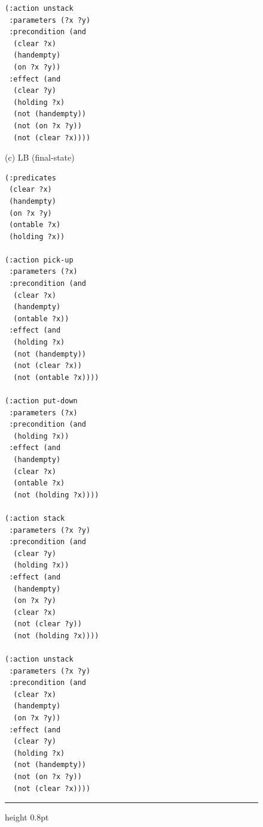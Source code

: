 \begin{figure}[t]
\begin{minipage}[t]{0.33\textwidth}
\begin{lstlisting}
(:action unstack
 :parameters (?x ?y)
 :precondition (and
  (clear ?x)
  (handempty)
  (on ?x ?y))
 :effect (and
  (clear ?y)
  (holding ?x)
  (not (handempty))
  (not (on ?x ?y))
  (not (clear ?x))))
\end{lstlisting}
\end{minipage}\hfill%
\begin{minipage}[t]{0.33\textwidth}
\vspace{0pt}
{\centering (c) LB (final-state)\par}
\begin{lstlisting}
(:predicates
 (clear ?x)
 (handempty)
 (on ?x ?y)
 (ontable ?x)
 (holding ?x))

(:action pick-up
 :parameters (?x)
 :precondition (and
  (clear ?x)
  (handempty)
  (ontable ?x))
 :effect (and
  (holding ?x)
  (not (handempty))
  (not (clear ?x))
  (not (ontable ?x))))

(:action put-down
 :parameters (?x)
 :precondition (and
  (holding ?x))
 :effect (and
  (handempty)
  (clear ?x)
  (ontable ?x)
  (not (holding ?x))))

(:action stack
 :parameters (?x ?y)
 :precondition (and
  (clear ?y)
  (holding ?x))
 :effect (and
  (handempty)
  (on ?x ?y)
  (clear ?x)
  (not (clear ?y))
  (not (holding ?x))))

(:action unstack
 :parameters (?x ?y)
 :precondition (and
  (clear ?x)
  (handempty)
  (on ?x ?y))
 :effect (and
  (clear ?y)
  (holding ?x)
  (not (handempty))
  (not (on ?x ?y))
  (not (clear ?x))))
\end{lstlisting}
\end{minipage}%
\par\vspace{0.6em}
\hrule height 0.8pt
\captionsetup{position=bottom}
\label{lst:blocksworld_full}
\end{figure}
\endgroup

